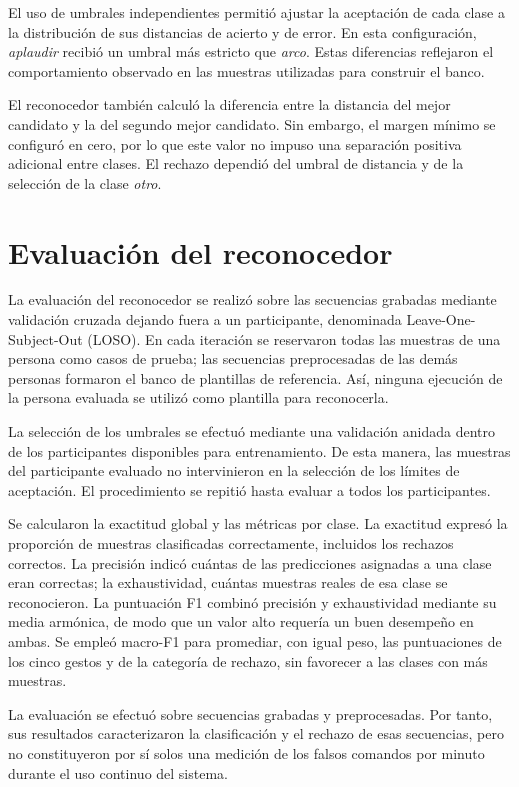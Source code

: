 El uso de umbrales independientes permitió ajustar la aceptación de cada clase a la distribución de sus distancias de acierto y de error. En esta configuración, \textit{aplaudir} recibió un umbral más estricto que \textit{arco}. Estas diferencias reflejaron el comportamiento observado en las muestras utilizadas para construir el banco.

El reconocedor también calculó la diferencia entre la distancia del mejor candidato y la del segundo mejor candidato. Sin embargo, el margen mínimo se configuró en cero, por lo que este valor no impuso una separación positiva adicional entre clases. El rechazo dependió del umbral de distancia y de la selección de la clase \textit{otro}.

\section{Evaluación del reconocedor}

La evaluación del reconocedor se realizó sobre las secuencias grabadas mediante validación cruzada dejando fuera a un participante, denominada Leave-One-Subject-Out (LOSO). En cada iteración se reservaron todas las muestras de una persona como casos de prueba; las secuencias preprocesadas de las demás personas formaron el banco de plantillas de referencia. Así, ninguna ejecución de la persona evaluada se utilizó como plantilla para reconocerla.

La selección de los umbrales se efectuó mediante una validación anidada dentro de los participantes disponibles para entrenamiento. De esta manera, las muestras del participante evaluado no intervinieron en la selección de los límites de aceptación. El procedimiento se repitió hasta evaluar a todos los participantes.

Se calcularon la exactitud global y las métricas por clase. La exactitud expresó la proporción de muestras clasificadas correctamente, incluidos los rechazos correctos. La precisión indicó cuántas de las predicciones asignadas a una clase eran correctas; la exhaustividad, cuántas muestras reales de esa clase se reconocieron. La puntuación F1 combinó precisión y exhaustividad mediante su media armónica, de modo que un valor alto requería un buen desempeño en ambas. Se empleó macro-F1 para promediar, con igual peso, las puntuaciones de los cinco gestos y de la categoría de rechazo, sin favorecer a las clases con más muestras.

La evaluación se efectuó sobre secuencias grabadas y preprocesadas. Por tanto, sus resultados caracterizaron la clasificación y el rechazo de esas secuencias, pero no constituyeron por sí solos una medición de los falsos comandos por minuto durante el uso continuo del sistema.

